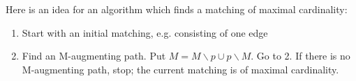 Here is an idea for an algorithm which finds a matching of maximal cardinality:
\begin{enumerate}
  \item {Start with an initial matching, e.g. consisting of one edge}
  \item {Find an M-augmenting path. Put $M = M \smallsetminus p \cup p \smallsetminus
  M$. Go to 2. If there is no M-augmenting path, stop; the current matching is
  of maximal cardinality.}
\end{enumerate}
